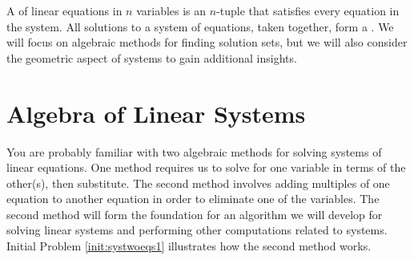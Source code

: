 \documentclass{ximera}
\begin{document}
A  of linear equations in $n$ variables is an $n$-tuple that satisfies every equation in  the system.  All solutions to a system of equations, taken together, form a .
We will focus on algebraic methods for finding solution sets, but we will also consider the geometric aspect of systems to gain additional insights.

\section*{Algebra of Linear Systems}

You are probably familiar with two algebraic methods for solving systems of linear equations.  One method requires us to solve for one variable in terms of the other(s), then substitute.  The second method involves adding multiples of one equation to another equation in order to eliminate one of the variables.  The second method will form the foundation for an algorithm we will develop for solving linear systems and performing other computations related to systems.  Initial Problem \ref{init:systwoeqs1} illustrates how the second method works.
\end{document}
